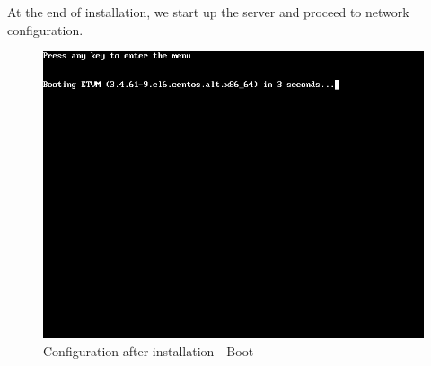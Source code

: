 At the end of installation, we start up the server and proceed to network configuration.

\begin{figure}[H]
	\begin{center}
    \includegraphics[scale=0.4]{screenshots/install/nuxis/pos_install_bootmenu.png}
    \caption{Configuration after installation - Boot}
	\label{fig:installation_enterprise_pos_01}
	\end{center}
\end{figure}

